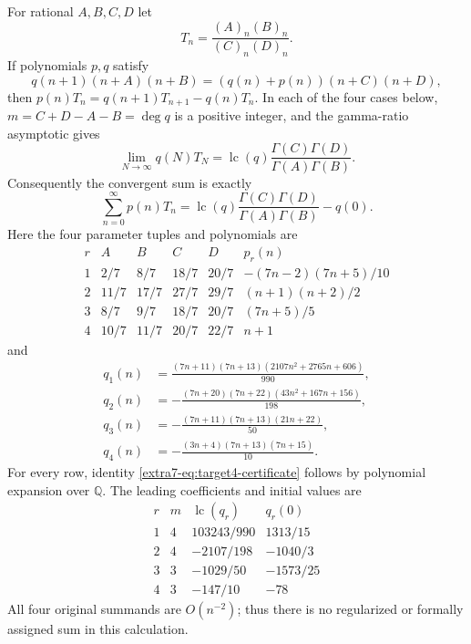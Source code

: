 \documentclass[11pt,a4paper]{article}
\theoremstyle{definition}
\theoremstyle{remark}
\numberwithin{equation}{section}
\begin{document}
For rational $A,B,C,D$ let
\[
 T_n=\frac{(A)_n(B)_n}{(C)_n(D)_n}.
\]
If polynomials $p,q$ satisfy
\begin{equation}\label{extra7-eq:target4-certificate}
 q(n+1)(n+A)(n+B)
   =(q(n)+p(n))(n+C)(n+D),
\end{equation}
then $p(n)T_n=q(n+1)T_{n+1}-q(n)T_n$. In each of the four cases below,
$m=C+D-A-B=\deg q$ is a positive integer, and the gamma-ratio asymptotic
gives
\[
 \lim_{N\longrightarrow\infty}q(N)T_N
   =\operatorname{lc}(q)\frac{\Gamma(C)\Gamma(D)}{\Gamma(A)\Gamma(B)}.
\]
Consequently the convergent sum is exactly
\begin{equation}\label{extra7-eq:target4-sum}
 \sum_{n=0}^{\infty}p(n)T_n
 =\operatorname{lc}(q)\frac{\Gamma(C)\Gamma(D)}{\Gamma(A)\Gamma(B)}-q(0).
\end{equation}
Here the four parameter tuples and polynomials are
\[
\begin{array}{c|rrrr|l}
 r&A&B&C&D&p_r(n)\\ \hline
 1&2/7&8/7&18/7&20/7&-(7n-2)(7n+5)/10\\
 2&11/7&17/7&27/7&29/7&(n+1)(n+2)/2\\
 3&8/7&9/7&18/7&20/7&(7n+5)/5\\
 4&10/7&11/7&20/7&22/7&n+1
\end{array}
\]
and
\begin{align*}
 q_1(n)&=\frac{(7n+11)(7n+13)(2107n^2+2765n+606)}{990},\\
 q_2(n)&=-\frac{(7n+20)(7n+22)(43n^2+167n+156)}{198},\\
 q_3(n)&=-\frac{(7n+11)(7n+13)(21n+22)}{50},\\
 q_4(n)&=-\frac{(3n+4)(7n+13)(7n+15)}{10}.
\end{align*}
For every row, identity \eqref{extra7-eq:target4-certificate} follows by polynomial
expansion over $\mathbb Q$. The leading coefficients and initial values are
\[
\begin{array}{c|r|r|r}
 r&m&\operatorname{lc}(q_r)&q_r(0)\\ \hline
 1&4&103243/990&1313/15\\
 2&4&-2107/198&-1040/3\\
 3&3&-1029/50&-1573/25\\
 4&3&-147/10&-78
\end{array}
\]
All four original summands are $O(n^{-2})$; thus there is no regularized or
formally assigned sum in this calculation.
\end{document}
